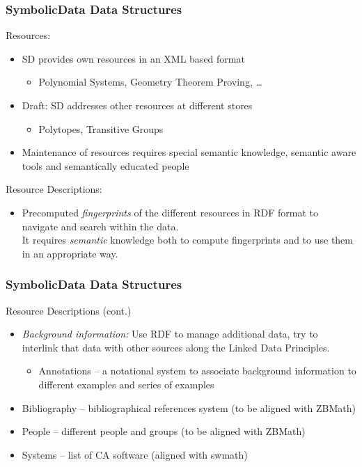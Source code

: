 \documentclass{beamer}
\begin{document}
\begin{frame}\frametitle{SymbolicData Data Structures}
Resources:
\begin{itemize}
\item SD provides own resources in an XML based format
\begin{itemize}
\item Polynomial Systems, Geometry Theorem Proving, \ldots
\end{itemize}
\item Draft: SD addresses other resources at different stores
\begin{itemize}
\item Polytopes, Transitive Groups
\end{itemize}
\item Maintenance of resources requires special semantic knowledge, semantic
  aware tools and semantically educated people
\end{itemize}
Resource Descriptions: 
\begin{itemize}
\item Precomputed \emph{fingerprints} of the different resources in RDF format
  to navigate and search within the data.\\ It requires \emph{semantic}
  knowledge both to compute fingerprints and to use them in an appropriate
  way.
\end{itemize}
\end{frame}

\begin{frame}\frametitle{SymbolicData Data Structures}
Resource Descriptions (cont.)
\begin{itemize}
\item \emph{Background information:} Use RDF to manage additional data, try to
interlink that data with other sources along the Linked Data Principles.
\begin{itemize}
\item Annotations -- a notational system to associate background information
  to different examples and series of examples
\end{itemize}
\item Bibliography -- bibliographical references system (to be aligned with
  ZBMath)
\item People -- different people and groups (to be aligned with ZBMath)
\item Systems -- list of CA software (aligned with swmath) 
\end{itemize}
\end{frame}
\end{document}

